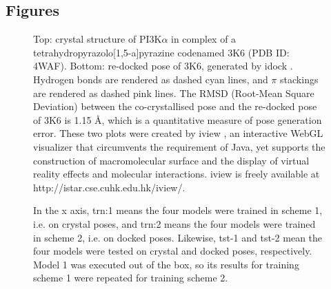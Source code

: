 \documentclass[twocolumn]{bmcart}
\begin{document}
\begin{backmatter}



\section*{Figures}

\begin{figure}[h]
\caption{ Top: crystal structure of PI3K$\alpha$ in complex of a tetrahydropyrazolo[1,5-a]pyrazine codenamed 3K6 (PDB ID: 4WAF). Bottom: re-docked pose of 3K6, generated by idock \cite{1362}. Hydrogen bonds are rendered as dashed cyan lines, and $\pi$ stackings are rendered as dashed pink lines. The RMSD (Root-Mean Square Deviation) between the co-crystallised pose and the re-docked pose of 3K6 is 1.15 \AA, which is a quantitative measure of pose generation error. These two plots were created by iview \cite{1366}, an interactive WebGL visualizer that circumvents the requirement of Java, yet supports the construction of macromolecular surface and the display of virtual reality effects and molecular interactions. iview is freely available at http://istar.cse.cuhk.edu.hk/iview/.
}
\label{fig:4WAF}
\end{figure}

\begin{figure}
\centering
\caption{ In the x axis, trn:1 means the four models were trained in scheme 1, i.e. on crystal poses, and trn:2 means the four models were trained in scheme 2, i.e. on docked poses. Likewise, tst-1 and tst-2 mean the four models were tested on crystal and docked poses, respectively. Model 1 was executed out of the box, so its results for training scheme 1 were repeated for training scheme 2.}
\label{rescoring2:set-1-pdbbind-2007-boxplot}
\end{figure}


\end{backmatter}
\end{document}
